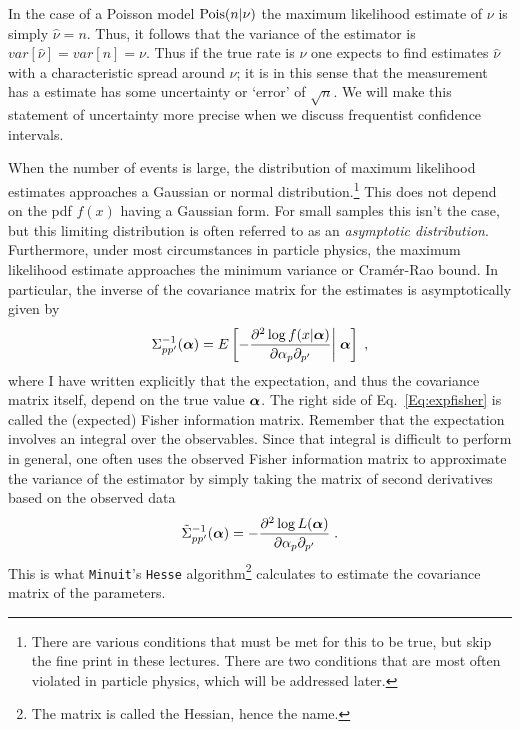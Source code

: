 \documentclass{cernrep}
\def\vec#1{\ifmmode
\mathchoice{\mbox{\boldmath$\displaystyle\bf#1$}}
{\mbox{\boldmath$\textstyle\bf#1$}}
{\mbox{\boldmath$\scriptstyle\bf#1$}}
{\mbox{\boldmath$\scriptscriptstyle\bf#1$}}\else
{\mbox{\boldmath$\bf#1$}}\fi}
\newcommand{\Pois}{{\ensuremath{\rm Pois}}}
\begin{document}
In the case of a Poisson model $\Pois(n|\nu)$ the maximum likelihood estimate of $\nu$ is simply \mbox{$\hat{\nu}=n$}.  Thus, it follows that the variance of the estimator is $var[\hat{\nu}]=var[n]=\nu$.  Thus if the true rate is $\nu$ one expects to find estimates $\hat{\nu}$ with a characteristic spread around $\nu$; it is in this sense that the measurement has a estimate has some uncertainty or `error' of $\sqrt{n}$.  We will make this statement of uncertainty more precise when we discuss frequentist confidence intervals.

When the number of events is large, the distribution of maximum likelihood estimates approaches a Gaussian or normal distribution.\footnote{There are various conditions that must be met for this to be true, but skip the fine print in these lectures.  There are two conditions that are most often violated in particle physics, which will be addressed later.}  This does not depend on the pdf $f(x)$ having a Gaussian form.  For small samples this isn't the case, but this limiting distribution is often referred to as an \textit{asymptotic distribution}.
Furthermore, under most circumstances in particle physics, the maximum likelihood estimate approaches the minimum variance or Cram\'er-Rao bound. In particular, the inverse of the covariance matrix for the estimates is asymptotically given by
\begin{equation}
\label{Eq:expfisher}
\Sigma_{pp'}^{-1}(\vec\alpha) = E\left[- \frac{\partial^2 \log f(x|\vec{\alpha})}{\partial\alpha_p \partial_{p'}}  \middle| \;\vec\alpha \right ]  \;,
\end{equation}
where I have written explicitly that the expectation, and thus the covariance matrix itself, depend on the true value $\vec\alpha$.  The right side of Eq.~\ref{Eq:expfisher} is called the (expected) Fisher information matrix. Remember that the expectation involves an integral over the observables.  Since that integral is difficult to perform in general, one often uses the observed Fisher information matrix to approximate the variance of the estimator by simply taking the matrix of second derivatives based on the observed data
\begin{equation}
\label{Eq:obsfisher}
\tilde\Sigma_{pp'}^{-1}(\vec\alpha) = - \frac{\partial^2 \log L(\vec{\alpha})}{\partial\alpha_p \partial_{p'}}  \; .
\end{equation}
This is what \texttt{Minuit}'s \texttt{Hesse} algorithm\footnote{The matrix is called the Hessian, hence the name.} calculates to estimate the covariance matrix of the parameters.
\end{document}
